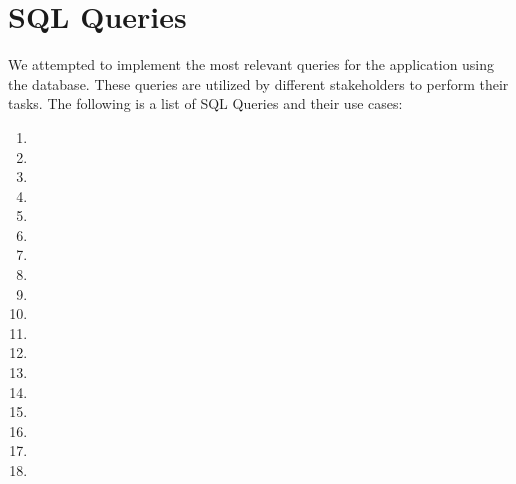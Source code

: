 
\section*{\Huge SQL Queries}
We attempted to implement the most relevant queries for the application using the database.
These queries are utilized by different stakeholders to perform their tasks.
The following is a list of SQL Queries and their use cases:

\begin{enumerate}
    \item 
    \item 
    \item 
    \item 
    \item 
    \item 
    \item 
    \item 
    \item 
    \item 
    \item 
    \item 
    \item 
    \item 
    \item 
    \item 
    \item 
    \item 
\end{enumerate}

\pagebreak